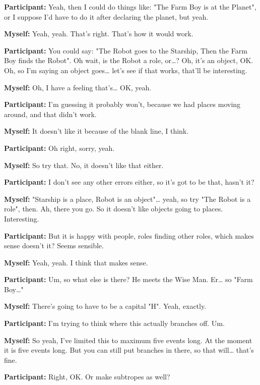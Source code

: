 \documentclass[11pt]{report}
\newcommand{\llabel}[1]{\hypertarget{llineno:#1}{\linelabel{#1}}}
\begin{document}
\begin{linenumbers}
\textbf{Participant:} Yeah, then I could do things like: "The Farm Boy is at the Planet", or I suppose I'd have to do it after declaring the planet, but yeah.

\textbf{Myself:} Yeah, yeah. That's right. That's how it would work.

\textbf{Participant:} You could say: "The Robot goes to the Starship, Then the
Farm Boy finds the Robot". Oh wait, is the Robot a role, or\ldots{}? Oh, it's an
object, OK. Oh, so I'm saying an object goes\ldots{} let's see if that works,
that'll be interesting.\llabel{lne:feature6d2}

\textbf{Myself:} Oh, I have a feeling that's\ldots{} OK, yeah.

\textbf{Participant:} I'm guessing it probably won't, because we had places moving around, and that didn't work.

\textbf{Myself:} It doesn't like it because of the blank line, I think.

\textbf{Participant:} Oh right, sorry, yeah.

\textbf{Myself:} So try that. No, it doesn't like that either.

\textbf{Participant:} I don't see any other errors either, so it's got to be that, hasn't it?

\textbf{Myself:} "Starship is a place, Robot is an object"\ldots{} yeah, so try "The Robot is a role", then. Ah, there you go. So it doesn't like objects going to places. Interesting.

\textbf{Participant:} But it is happy with people, roles finding other roles, which makes sense doesn't it? Seems sensible.

\textbf{Myself:} Yeah, yeah. I think that makes sense.

\textbf{Participant:} Um, so what else is there? He meets the Wise Man. Er\ldots{} so "Farm Boy\ldots{}"

\textbf{Myself:} There's going to have to be a capital "H". Yeah, exactly.\llabel{lne:syntax5d4}

\textbf{Participant:} I'm trying to think where this actually branches off. Um.

\textbf{Myself:} So yeah, I've limited this to maximum five events long. At the
moment it is five events long. But you can still put branches in there, so that
will\ldots{} that's fine.\llabel{lne:bug1d}

\textbf{Participant:} Right, OK. Or make subtropes as well?


\end{linenumbers}
\end{document}
